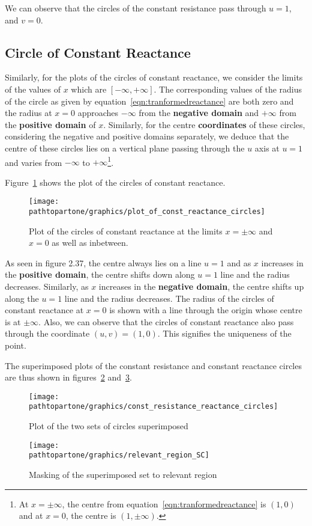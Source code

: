 We can observe that the circles of the constant resistance pass through $u = 1$, and $v = 0$.

\subsection{Circle of Constant Reactance}
Similarly, for the plots of the circles of constant reactance, we consider the limits of the values of $x$ which are $[-\infty, +\infty]$. The corresponding values of the radius of the circle as given by equation~\eqref{eqn:tranformedreactance} are both zero and the radius at $x = 0$ approaches $-\infty$ from the \textbf{negative domain} and $+\infty$ from the \textbf{positive domain} of $x$. Similarly, for the centre \textbf{coordinates} of these circles, considering the negative and positive domains separately, we deduce that the centre of these circles lies on a vertical plane passing through the $u$ axis at $u = 1$ and varies from $-\infty$ to $+\infty$\footnote{
At $x = \pm\infty$, the centre from equation~\eqref{eqn:tranformedreactance} is $(1, 0)$ and at $x = 0$, the centre is $(1, \pm\infty)$.
}.

Figure~\ref{fig:uytrdbn} shows the plot of the circles of constant reactance.
\begin{figure}[h]
\centering
\texttt{[image: \\pathtopartone/graphics/plot\_of\_const\_reactance\_circles]}
\caption{Plot of the circles of constant reactance at the limits $x = \pm\infty$ and $x = 0$ as well as inbetween.}
\label{fig:uytrdbn}
\end{figure}

As seen in figure 2.37, the centre always lies on a line $u = 1$ and as $x$ increases in the \textbf{positive domain}, the centre shifts down along $u = 1$ line and the radius decreases. Similarly, as $x$ increases in the \textbf{negative domain}, the centre shifts up along the $u = 1$ line and the radius decreases. The radius of the circles of constant reactance at $x = 0$ is shown with a line through the origin whose centre is at $\pm\infty$. Also, we can observe that the circles of constant reactance also pass through the coordinate $(u,v) = (1,0)$. This signifies the uniqueness of the point. 

The superimposed plots of the constant resistance and constant reactance circles are thus shown in figures~\ref{fig:ijnbvcxw} and~\ref{fig:sddfghj}.
\begin{figure}[h]
\centering
\texttt{[image: \\pathtopartone/graphics/const\_resistance\_reactance\_circles]}
\caption{Plot of the two sets of circles superimposed}
\label{fig:ijnbvcxw}
\end{figure}
\begin{figure}[h]
\centering
\texttt{[image: \\pathtopartone/graphics/relevant\_region\_SC]}
\caption{Masking of the superimposed set to relevant region}
\label{fig:sddfghj}
\end{figure}

